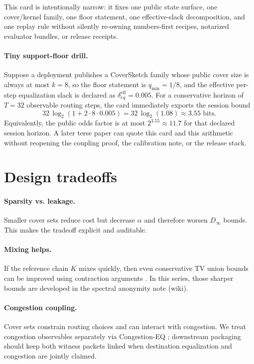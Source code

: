 \documentclass[11pt]{article}
\begin{document}
This card is intentionally narrow: it fixes one public state surface, one cover/kernel family, one floor statement, one effective-slack decomposition, and one replay rule without silently re-owning numbers-first recipes, notarized evaluator bundles, or release receipts.\cite{series:eval3,series:eval1,series:release}

\paragraph{Tiny support-floor drill.}
Suppose a deployment publishes a CoverSketch family whose public cover size is always at most $k=8$, so the floor statement is $q_{\min}=1/8$, and the effective per-step equalization slack is declared as $\delta_{eq}^{\mathrm{eff}}=0.005$.
For a conservative horizon of $T=32$ observable routing steps, the card immediately exports the session bound
\[
32\,\log_2(1+2\cdot 8 \cdot 0.005) = 32\,\log_2(1.08) \approx 3.55 \text{ bits}.
\]
Equivalently, the public odds factor is at most $2^{3.55}\approx 11.7$ for that declared session horizon.
A later terse paper can quote this card and this arithmetic without reopening the coupling proof, the calibration note, or the release stack.

\section{Design tradeoffs}
\paragraph{Sparsity vs. leakage.}
Smaller cover sets reduce cost but decrease $\alpha$ and therefore worsen $D_\infty$ bounds.
This makes the tradeoff explicit and auditable.

\paragraph{Mixing helps.}
If the reference chain $K$ mixes quickly, then even conservative TV union bounds can be improved using contraction arguments \cite{levin_peres_wilmer_mixing}.
In this series, those sharper bounds are developed in the spectral anonymity note (wiki).

\paragraph{Congestion coupling.}
Cover sets constrain routing choices and can interact with congestion.
We treat congestion observables separately via Congestion-EQ \cite{series:congeq}; downstream packaging should keep both witness packets linked when destination equalization and congestion are jointly claimed.
\end{document}
